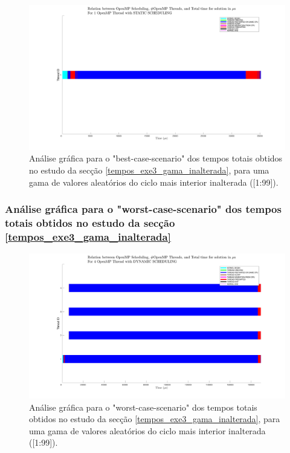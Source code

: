 \documentclass[a4paper]{article}
\begin{document}
        
        \begin{figure}[H]
    \centering
    \includegraphics[width=0.9\columnwidth]{PNG/best_static_1_thread.png}
        \caption{ Análise gráfica para o "best-case-scenario" dos tempos totais obtidos no estudo da secção \ref{tempos_exe3_gama_inalterada}, para uma gama de valores aleatórios do ciclo mais interior inalterada ([1:99]). }
    \label{fig:best_static_1_thread}
    \end{figure}
    
       
        \subsubsection{Análise gráfica para o "worst-case-scenario" dos tempos totais obtidos no estudo da secção \ref{tempos_exe3_gama_inalterada}}
        
       
        
           \begin{figure}[H]
    \centering
    \includegraphics[width=0.9\columnwidth]{PNG/worst_dynamic_4_threads.png}
        \caption{ Análise gráfica para o "worst-case-scenario" dos tempos totais obtidos no estudo da secção \ref{tempos_exe3_gama_inalterada}, para uma gama de valores aleatórios do ciclo mais interior inalterada ([1:99]). }
    \label{fig:worst_dynamic_4_threads}
    \end{figure}
    
\end{document}
